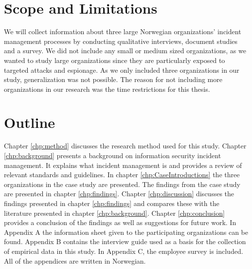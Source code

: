 \section{Scope and Limitations}
We will collect information about three large Norwegian organizations' incident management processes by conducting qualitative interviews, document studies and a survey. We did not include any small or medium sized organizations, as we wanted to study large organizations since they are particularly exposed to targeted attacks and espionage. As we only included three organizations in our study, generalization was not possible. The reason for not including more organizations in our research was the time restrictions for this thesis.

\section{Outline}
Chapter \ref{chp:method} discusses the research method used for this study.
Chapter \ref{chp:background} presents a background on information security incident management. It explains what incident management is and provides a review of relevant standards and guidelines. In chapter \ref{chp:CaseIntroductions} the three organizations in the case study are presented. The findings from the case study are presented in chapter \ref{chp:findings}. Chapter \ref{chp:discussion} discusses the findings presented in chapter \ref{chp:findings} and compares these with the literature presented in chapter \ref{chp:background}. Chapter \ref{chp:conclusion} provides a conclusion of the findings as well as suggestions for future work. In Appendix A the information sheet given to the participating organizations can be found. Appendix B contains the interview guide used as a basis for the collection of empirical data in this study. In Appendix C, the employee survey is included. All of the appendices are written in Norwegian.
